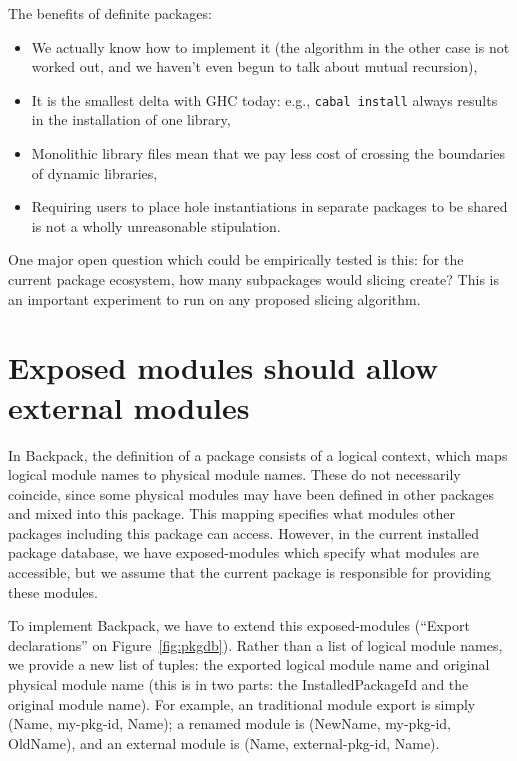 \documentclass{article}
\begin{document}
The benefits of definite packages:

\begin{itemize}
    \item We actually know how to implement it (the algorithm in the other
        case is not worked out, and we haven't even begun to talk about
        mutual recursion),
    \item It is the smallest delta with GHC today: e.g., \verb|cabal install|
        always results in the installation of one library,
    \item Monolithic library files mean that we pay less cost of
        crossing the boundaries of dynamic libraries,
    \item Requiring users to place hole instantiations in separate packages
        to be shared is not a wholly unreasonable stipulation.
\end{itemize}

One major open question which could be empirically tested is this: for the
current package ecosystem, how many subpackages would slicing create?
This is an important experiment to run on any proposed slicing algorithm.

\section{Exposed modules should allow external modules}\label{sec:reexport}

In Backpack, the definition of a package consists of a logical context,
which maps logical module names to physical module names.  These do not
necessarily coincide, since some physical modules may have been defined
in other packages and mixed into this package.  This mapping specifies
what modules other packages including this package can access.
However, in the current installed package database, we have exposed-modules which
specify what modules are accessible, but we assume that the current
package is responsible for providing these modules.

To implement Backpack, we have to extend this exposed-modules (``Export declarations''
on Figure~\ref{fig:pkgdb}).  Rather
than a list of logical module names, we provide a new list of tuples:
the exported logical module name and original physical module name (this
is in two parts: the InstalledPackageId and the original module name).
For example, an traditional module export is simply (Name, my-pkg-id, Name);
a renamed module is (NewName, my-pkg-id, OldName), and an external module
is (Name, external-pkg-id, Name).
\end{document}
